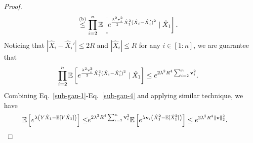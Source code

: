 \begin{proof}
\begin{align}
        \overset{\text{(b)}}{\leq}\prod_{i=2}^n\mathbb{E}\left[e^{\frac{\lambda^2\mathbf{v}_i^2}{2}\hat{X}_1^2(\hat{X}_i-\hat{X}_i')^2}\mid\hat{X}_1\right].
    \end{align}
    Noticing that $|\hat{X}_i-\hat{X}_i'|\leq 2R$ and $|\hat{X}_i|\leq R$ for any $i\in[1:n]$, we are guarantee that
    \begin{align}\label{sub-gau-4}
        \prod_{i=2}^n\mathbb{E}\left[e^{\frac{\lambda^2\mathbf{v}_i^2}{2}\hat{X}_1^2(\hat{X}_i-\hat{X}_i')^2}\mid\hat{X}_1\right]\leq e^{2\lambda^2R^4\sum_{i=2}^n\mathbf{v}_i^2}.
    \end{align}
    Combining Eq.~\eqref{sub-gau-1}-Eq.~\eqref{sub-gau-4} and applying similar technique, we have
    \begin{align}
        \mathbb{E}\left[e^{\lambda \left(Y\hat{X}_1-\mathbb{E}[Y\hat{X}_1]\right)}\right]\leq& e^{2\lambda^2R^4\sum_{i=2}^n\mathbf{v}_i^2}\mathbb{E}\left[e^{\lambda\mathbf{v}_i\left(\hat{X}_1^2-\mathbb{E}[\hat{X}_1^2]\right)}\right]\leq e^{2\lambda^2R^4\|\mathbf{v}\|_2^2}.\notag
    \end{align}
\end{proof}

